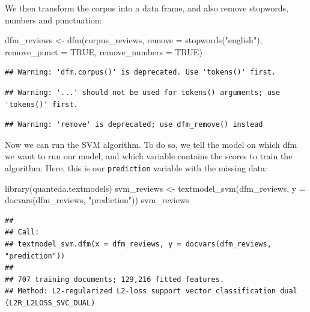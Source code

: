 \documentclass[
]{book}
\newenvironment{Shaded}{\begin{snugshade}}{\end{snugshade}}
\newcommand{\AttributeTok}[1]{\textcolor[rgb]{0.77,0.63,0.00}{#1}}
\newcommand{\ConstantTok}[1]{\textcolor[rgb]{0.00,0.00,0.00}{#1}}
\newcommand{\FunctionTok}[1]{\textcolor[rgb]{0.00,0.00,0.00}{#1}}
\newcommand{\NormalTok}[1]{#1}
\newcommand{\OtherTok}[1]{\textcolor[rgb]{0.56,0.35,0.01}{#1}}
\newcommand{\StringTok}[1]{\textcolor[rgb]{0.31,0.60,0.02}{#1}}
\begin{document}
We then transform the corpus into a data frame, and also remove stopwords, numbers and punctuation:

\begin{Shaded}
\begin{Highlighting}[]
\NormalTok{dfm\_reviews }\OtherTok{\textless{}{-}} \FunctionTok{dfm}\NormalTok{(corpus\_reviews, }\AttributeTok{remove =} \FunctionTok{stopwords}\NormalTok{(}\StringTok{"english"}\NormalTok{), }\AttributeTok{remove\_punct =} \ConstantTok{TRUE}\NormalTok{, }\AttributeTok{remove\_numbers =} \ConstantTok{TRUE}\NormalTok{)}
\end{Highlighting}
\end{Shaded}

\begin{verbatim}
## Warning: 'dfm.corpus()' is deprecated. Use 'tokens()' first.
\end{verbatim}

\begin{verbatim}
## Warning: '...' should not be used for tokens() arguments; use 'tokens()' first.
\end{verbatim}

\begin{verbatim}
## Warning: 'remove' is deprecated; use dfm_remove() instead
\end{verbatim}

Now we can run the SVM algorithm. To do so, we tell the model on which dfm we want to run our model, and which variable contains the scores to train the algorithm. Here, this is our \texttt{prediction} variable with the missing data:

\begin{Shaded}
\begin{Highlighting}[]
\FunctionTok{library}\NormalTok{(quanteda.textmodels)}
\NormalTok{svm\_reviews }\OtherTok{\textless{}{-}} \FunctionTok{textmodel\_svm}\NormalTok{(dfm\_reviews, }\AttributeTok{y =} \FunctionTok{docvars}\NormalTok{(dfm\_reviews, }\StringTok{"prediction"}\NormalTok{))}
\NormalTok{svm\_reviews}
\end{Highlighting}
\end{Shaded}

\begin{verbatim}
## 
## Call:
## textmodel_svm.dfm(x = dfm_reviews, y = docvars(dfm_reviews, "prediction"))
## 
## 707 training documents; 129,216 fitted features.
## Method: L2-regularized L2-loss support vector classification dual (L2R_L2LOSS_SVC_DUAL)
\end{verbatim}
\end{document}
